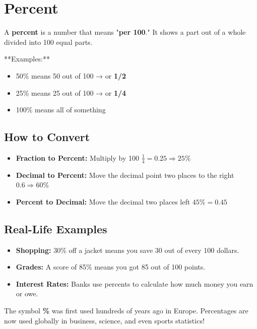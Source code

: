 \cleardoublepage
\section{Percent}

A \textbf{percent} is a number that means "\textbf{per 100}." It shows a part out of a whole divided into 100 equal parts.

**Examples:**
\begin{itemize}
  \item 50\% means 50 out of 100 → or \textbf{1/2}
  \item 25\% means 25 out of 100 → or \textbf{1/4}
  \item 100\% means all of something
\end{itemize}

\subsection*{How to Convert}

\begin{itemize}
  \item \textbf{Fraction to Percent:} Multiply by 100  
    $\frac{1}{4} = 0.25 \Rightarrow 25\%$
  \item \textbf{Decimal to Percent:} Move the decimal point two places to the right  
    $0.6 \Rightarrow 60\%$
  \item \textbf{Percent to Decimal:} Move the decimal two places left  
    $45\% = 0.45$
\end{itemize}

\subsection*{Real-Life Examples}

\begin{itemize}
  \item \textbf{Shopping:} 30\% off a jacket means you save 30 out of every 100 dollars.
  \item \textbf{Grades:} A score of 85\% means you got 85 out of 100 points.
  \item \textbf{Interest Rates:} Banks use percents to calculate how much money you earn or owe.
\end{itemize}

The symbol \textbf{\%} was first used hundreds of years ago in Europe. Percentages are now used globally in business, science, and even sports statistics!





